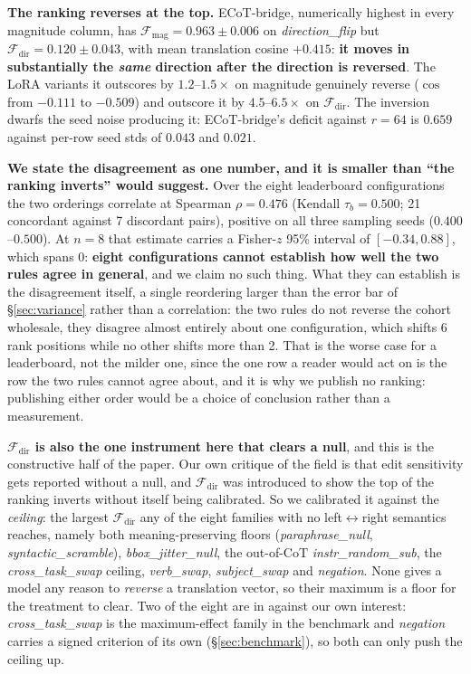 \documentclass[11pt]{article}
\begin{document}
\begin{table}[t]
\label{tab:directional}
\end{table}

\textbf{The ranking reverses at the top.} ECoT-bridge, numerically highest in every magnitude column, has $\mathcal{F}_{\text{mag}} = 0.963 \pm 0.006$ on \emph{direction\_flip} but $\mathcal{F}_{\text{dir}} = 0.120 \pm 0.043$, with mean translation cosine $+0.415$: \textbf{it moves in substantially the \emph{same} direction after the direction is reversed}. The LoRA variants it outscores by $1.2$--$1.5\times$ on magnitude genuinely reverse ($\cos$ from $-0.111$ to $-0.509$) and outscore it by $4.5$--$6.5\times$ on $\mathcal{F}_{\text{dir}}$. The inversion dwarfs the seed noise producing it: ECoT-bridge's deficit against $r{=}64$ is $0.659$ against per-row seed stds of $0.043$ and $0.021$.

\textbf{We state the disagreement as one number, and it is smaller than ``the ranking inverts'' would suggest.} Over the eight leaderboard configurations the two orderings correlate at Spearman $\rho = 0.476$ (Kendall $\tau_b = 0.500$; 21 concordant against 7 discordant pairs), positive on all three sampling seeds ($0.400$--$0.500$). At $n{=}8$ that estimate carries a Fisher-$z$ 95\% interval of $[-0.34, 0.88]$, which spans $0$: \textbf{eight configurations cannot establish how well the two rules agree in general}, and we claim no such thing. What they can establish is the disagreement itself, a single reordering larger than the error bar of \S\ref{sec:variance} rather than a correlation: the two rules do not reverse the cohort wholesale, they disagree almost entirely about one configuration, which shifts 6 rank positions while no other shifts more than 2. That is the worse case for a leaderboard, not the milder one, since the one row a reader would act on is the row the two rules cannot agree about, and it is why we publish no ranking: publishing either order would be a choice of conclusion rather than a measurement.

\textbf{$\mathcal{F}_{\text{dir}}$ is also the one instrument here that clears a null}, and this is the constructive half of the paper. Our own critique of the field is that edit sensitivity gets reported without a null, and $\mathcal{F}_{\text{dir}}$ was introduced to show the top of the ranking inverts without itself being calibrated. So we calibrated it against the \emph{ceiling}: the largest $\mathcal{F}_{\text{dir}}$ any of the eight families with no left$\leftrightarrow$right semantics reaches, namely both meaning-preserving floors (\emph{paraphrase\_null}, \emph{syntactic\_scramble}), \emph{bbox\_jitter\_null}, the out-of-CoT \emph{instr\_random\_sub}, the \emph{cross\_task\_swap} ceiling, \emph{verb\_swap}, \emph{subject\_swap} and \emph{negation}. None gives a model any reason to \emph{reverse} a translation vector, so their maximum is a floor for the treatment to clear. Two of the eight are in against our own interest: \emph{cross\_task\_swap} is the maximum-effect family in the benchmark and \emph{negation} carries a signed criterion of its own (\S\ref{sec:benchmark}), so both can only push the ceiling up.
\end{document}
